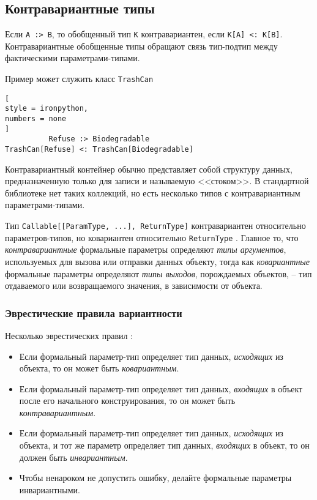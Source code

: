 \documentclass[%
	11pt,
	a4paper,
	utf8,
		]{article}
\begin{document}
\subsection{Контравариантные типы}

Если \verb|A :> B|, то обобщенный тип \verb|K| контравариантен, если \verb*|K[A] <: K[B]|. Контравариантные обобщенные типы обращают связь тип-подтип между фактическими параметрами-типами.

Пример может служить класс \verb*|TrashCan|
\begin{lstlisting}[
style = ironpython,
numbers = none
]
          Refuse :> Biodegradable
TrashCan[Refuse] <: TrashCan[Biodegradable] 
\end{lstlisting}

Контравариантный контейнер обычно представляет собой структуру данных, предназначенную только для записи и называемую <<стоком>>. В стандартной библиотеке нет таких коллекций, но есть несколько типов с контравариантным параметрами-типами.

Тип \verb|Callable[[ParamType, ...], ReturnType]| контравариантен относительно параметров-типов, но ковариантен относительно \verb|ReturnType| \cite[]{ramalho:python-2022}. Главное то, что \emph{контравариантные} формальные параметры определяют \emph{типы аргументов}, используемых для вызова или отправки данных объекту, тогда как \emph{ковариантные} формальные параметры определяют \emph{типы выходов}, порождаемых объектов, -- тип отдаваемого или возвращаемого значения, в зависимости от объекта.

\subsubsection{Эврестические правила вариантности}

Несколько эврестических правил \cite[]{ramalho:python-2022}:

\begin{itemize}
	\item Если формальный параметр-тип определяет тип данных, \emph{исходящих} из объекта, то он может быть \emph{ковариантным}.
	
	\item Если формальный параметр-тип определяет тип данных, \emph{входящих} в объект после его начального конструирования, то он может быть \emph{контравариантным}.
	
	\item Если формальный параметр-тип определяет тип данных, \emph{исходящих} из объекта, и тот же параметр определяет тип данных, \emph{входящих} в объект, то он должен быть \emph{инвариантным}.
	
	\item Чтобы ненароком не допустить ошибку, делайте формальные параметры инвариантными.
\end{itemize}
\end{document}

